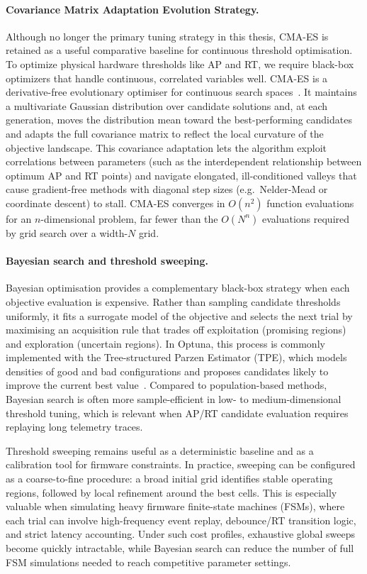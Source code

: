 \paragraph{Covariance Matrix Adaptation Evolution Strategy.}
Although no longer the primary tuning strategy in this thesis, CMA-ES is retained as a useful comparative baseline for continuous threshold optimisation. To optimize physical hardware thresholds like AP and RT, we require black-box optimizers that handle continuous, correlated variables well. CMA-ES is a derivative-free evolutionary optimiser for continuous search spaces~\cite{hansen_cma_2016}. It maintains a multivariate Gaussian distribution over candidate solutions and, at each generation, moves the distribution mean toward the best-performing candidates and adapts the full covariance matrix to reflect the local curvature of the objective landscape. This covariance adaptation lets the algorithm exploit correlations between parameters (such as the interdependent relationship between optimum AP and RT points) and navigate elongated, ill-conditioned valleys that cause gradient-free methods with diagonal step sizes (e.g.\ Nelder-Mead or coordinate descent) to stall. CMA-ES converges in $O(n^2)$ function evaluations for an $n$-dimensional problem, far fewer than the $O(N^n)$ evaluations required by grid search over a width-$N$ grid.

\paragraph{Bayesian search and threshold sweeping.}
Bayesian optimisation provides a complementary black-box strategy when each objective evaluation is expensive. Rather than sampling candidate thresholds uniformly, it fits a surrogate model of the objective and selects the next trial by maximising an acquisition rule that trades off exploitation (promising regions) and exploration (uncertain regions). In Optuna, this process is commonly implemented with the Tree-structured Parzen Estimator (TPE), which models densities of good and bad configurations and proposes candidates likely to improve the current best value~\cite{optuna_akiba_2019, bergstra_tpe_2011}. Compared to population-based methods, Bayesian search is often more sample-efficient in low- to medium-dimensional threshold tuning, which is relevant when AP/RT candidate evaluation requires replaying long telemetry traces.

Threshold sweeping remains useful as a deterministic baseline and as a calibration tool for firmware constraints. In practice, sweeping can be configured as a coarse-to-fine procedure: a broad initial grid identifies stable operating regions, followed by local refinement around the best cells. This is especially valuable when simulating heavy firmware finite-state machines (FSMs), where each trial can involve high-frequency event replay, debounce/RT transition logic, and strict latency accounting. Under such cost profiles, exhaustive global sweeps become quickly intractable, while Bayesian search can reduce the number of full FSM simulations needed to reach competitive parameter settings.

